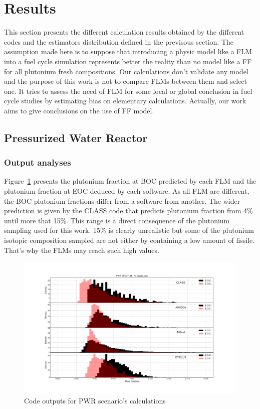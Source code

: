 
\section{Results}
This section presents the different calculation results obtained by the different codes and the estimators distribution defined in the previsous section. The assumption made here is to suppose that introducing a physic model like a FLM into a fuel cycle simulation represents better the reality than no model like a FF for all plutonium fresh compositions. Our calculations don't validate any model and the purpose of this work is not to compare FLMs between them and select one. It tries to assess the need of FLM for some local or global conclusion in fuel cycle studies by estimating bias on elementary calculations. Actually, our work aims to give conclusions on the use of FF model.   

\subsection{Pressurized Water Reactor}

\subsubsection{Output analyses}
Figure~\ref{fig:PWR_MOX_FLM_Pu} presents the plutonium fraction at BOC predicted by each FLM and the plutonium fraction at EOC deduced by each software. As all FLM are different, the BOC plutonium fractions differ from a software from another. The wider prediction is given by the CLASS code that predicts plutonium fraction from 4\% until more that 15\%. This range is a direct consequence of the plutonium sampling used for this work. 15\% is clearly unrealistic but some of the plutonium isotopic composition sampled are not either by containing a low amount of fissile. That's why the FLMs may reach such high values.    

\begin{figure}[h]
	\begin{center}
		\includegraphics[width = 0.99\textwidth]{../../Feature_1/RAW_DATA/FIG/PWR_MOX_FLM_Pu.pdf}
		\caption{Code outputs for PWR scenario's calculations}
		\label{fig:PWR_MOX_FLM_Pu}
	\end{center}
\end{figure}

